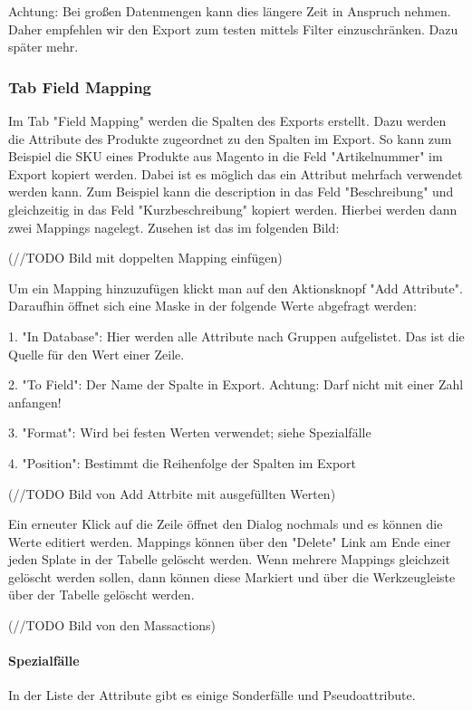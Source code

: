 \documentclass[a4paper]{article}
\begin{document}
Achtung: Bei großen Datenmengen kann dies längere Zeit in Anspruch 
nehmen. Daher empfehlen wir den Export zum testen mittels Filter 
einzuschränken. Dazu später mehr.

\subsubsection{Tab Field Mapping}
Im Tab "Field Mapping" werden die Spalten des Exports erstellt. Dazu 
werden die Attribute des Produkte zugeordnet zu den Spalten im Export. 
So kann zum Beispiel die SKU eines Produkte aus Magento in die Feld 
"Artikelnummer" im Export kopiert werden. Dabei ist es möglich das ein 
Attribut mehrfach verwendet werden kann. Zum Beispiel kann die 
description in das Feld "Beschreibung" und gleichzeitig in das Feld 
"Kurzbeschreibung" kopiert werden. Hierbei werden dann zwei Mappings 
nagelegt. Zusehen ist das im folgenden Bild:


(//TODO Bild mit doppelten Mapping einfügen)


Um ein Mapping hinzuzufügen klickt man auf den Aktionsknopf "Add 
Attribute". Daraufhin öffnet sich eine Maske in der folgende Werte 
abgefragt werden:

1. "In Database": Hier werden alle Attribute nach Gruppen aufgelistet. 
Das ist die Quelle für den Wert einer Zeile. 


2. "To Field": Der Name der Spalte in Export. Achtung: Darf nicht mit 
einer Zahl anfangen!


3. "Format": Wird bei festen Werten verwendet; siehe Spezialfälle


4. "Position": Bestimmt die Reihenfolge der Spalten im Export


(//TODO Bild von Add Attrbite mit ausgefüllten Werten)


Ein erneuter Klick auf die Zeile öffnet den Dialog nochmals und es 
können die Werte editiert werden. Mappings können über den "Delete" 
Link am Ende einer jeden Splate in der Tabelle gelöscht werden. Wenn 
mehrere Mappings gleichzeit gelöscht werden sollen, dann können diese 
Markiert und über die Werkzeugleiste über der Tabelle gelöscht werden.


(//TODO Bild von den Massactions)


\paragraph{Spezialfälle}
In der Liste der Attribute gibt es einige Sonderfälle und 
Pseudoattribute.
\end{document}
